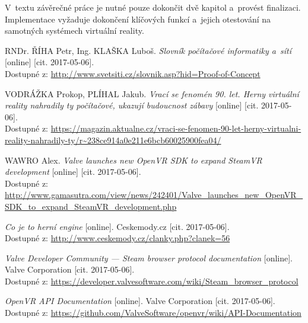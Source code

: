 \documentclass[12pt, a4paper]{article}
\begin{document}
V~textu závěrečné práce je nutné pouze dokončit dvě kapitol a~provést finalizaci. Implementace vyžaduje dokončení klíčových funkcí a~jejich otestování na samotných systémech virtuální reality.

\newpage

\renewcommand\refname{Zdroje}

\begingroup
\raggedright
\begin{thebibliography}{}
    		RNDr. ŘÍHA Petr, Ing. KLAŠKA Luboš. \emph{Slovník počítačové informatiky a~sítí} [online] [cit. 2017-05-06].\\ Dostupné z: \url{http://www.svetsiti.cz/slovnik.asp?hid=Proof-of-Concept}

    		VODRÁŽKA Prokop, PLÍHAL Jakub. \emph{Vrací se fenomén 90. let. Herny virtuální reality nahradily ty počítačové, ukazují budoucnost zábavy} [online] [cit. 2017-05-06].\\ Dostupné z: \url{https://magazin.aktualne.cz/vraci-se-fenomen-90-let-herny-virtualni-reality-nahradily-ty/r~238ce914a0e211e6bcb60025900fea04/}

    		WAWRO Alex. \emph{Valve launches new OpenVR SDK to expand SteamVR development} [online] [cit. 2017-05-06].\\ Dostupné z: \url{http://www.gamasutra.com/view/news/242401/Valve_launches_new_OpenVR_SDK_to_expand_SteamVR_development.php}

    		\emph{Co je to herní engine} [online]. Ceskemody.cz [cit. 2017-05-06].\\ Dostupné z: \url{http://www.ceskemody.cz/clanky.php?clanek=56}

    		\emph{Valve Developer Community --- Steam browser protocol documentation} [online]. Valve Corporation [cit. 2017-05-06].\\ Dostupné z: \url{https://developer.valvesoftware.com/wiki/Steam_browser_protocol}

    		\emph{OpenVR API Documentation} [online]. Valve Corporation [cit. 2017-05-06].\\ Dostupné z: \url{https://github.com/ValveSoftware/openvr/wiki/API-Documentation}
\end{thebibliography}
\endgroup
\end{document}
